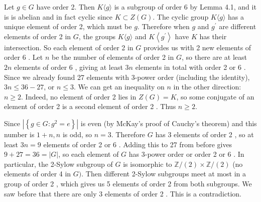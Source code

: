 Let $g \in G$ have order 2. Then $K\langle g\rangle$ is a subgroup of order 6 by Lemma 4.1, and it is is abelian and in fact cyclic since $K \subset Z(G)$. The cyclic group $K\langle g\rangle$ has a unique element of order 2, which must be $g$. Therefore when $g$ and $g^{\prime}$ are different elements of order 2 in $G$, the groups $K\langle g\rangle$ and $K\left\langle g^{\prime}\right\rangle$ have $K$ has their intersection. So each element of order 2 in $G$ provides us with 2 new elements of order 6 . Let $n$ be the number of elements of order 2 in $G$, so there are at least $2 n$ elements of order 6 , giving at least $3 n$ elements in total with order 2 or 6 . Since we already found 27 elements with 3-power order (including the identity), $3 n \leq 36-27$, or $n \leq 3$. We can get an inequality on $n$ in the other direction: $n \geq 2$. Indeed, no element of order 2 lies in $Z(G)=K$, so some conjugate of an element of order 2 is a second element of order 2 . Thus $n \geq 2$.

Since $\left|\left\{g \in G: g^2=e\right\}\right|$ is even (by McKay's proof of Cauchy's theorem) and this number is $1+n, n$ is odd, so $n=3$. Therefore $G$ has 3 elements of order 2 , so at least $3 n=9$ elements of order 2 or 6 . Adding this to 27 from before gives $9+27=36=|G|$, so each element of $G$ has 3-power order or order 2 or 6 . In particular, the 2-Sylow subgroup of $G$ is isomorphic to $\mathbb{Z} /(2) \times \mathbb{Z} /(2)$ (no elements of order 4 in $G)$. Then different 2-Sylow subgroups meet at most in a group of order 2 , which gives us 5 elements of order 2 from both subgroups. We saw before that there are only 3 elements of order 2 . This is a contradiction.
